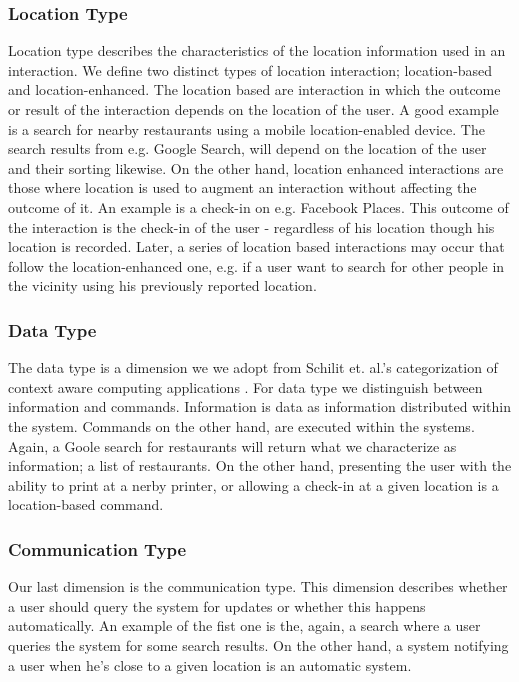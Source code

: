 \subsubsection{Location Type}
Location type describes the characteristics of the location information used in an interaction. We define two distinct types of location interaction; location-based and location-enhanced. The location based are interaction in which the outcome or result of the interaction depends on the location of the user. A good example is a search for nearby restaurants using a mobile location-enabled device. The search results from e.g. Google Search, will depend on the location of the user and their sorting likewise. On the other hand, location enhanced interactions are those where location is used to augment an interaction without affecting the outcome of it. An example is a check-in on e.g. Facebook Places. This outcome of the interaction is the check-in of the user - regardless of his location though his location is recorded. Later, a series of location based interactions may occur that follow the location-enhanced one, e.g. if a user want to search for other people in the vicinity using his previously reported location.

\subsubsection{Data Type}
The data type is a dimension we we adopt from Schilit et. al.'s categorization of context aware computing applications \cite{512740}. For data type we distinguish between information and commands. Information is data as information distributed within the system. Commands on the other hand, are executed within the systems. Again, a Goole search for restaurants will return what we characterize as information; a list of restaurants. On the other hand, presenting the user with the ability to print at a nerby printer, or allowing a check-in at a given location is a location-based command.

\subsubsection{Communication Type}
Our last dimension is the communication type. This dimension describes whether a user should query the system for updates or whether this happens automatically. An example of the fist one is the, again, a search where a user queries the system for some search results. On the other hand, a system notifying a user when he's close to a given location is an automatic system.  

